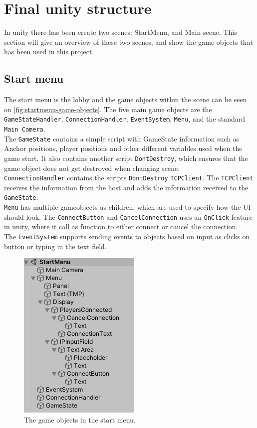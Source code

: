 \section{Final unity structure}
In unity there has been create two scenes: StartMenu, and Main scene.
This section will give an overview of these two scenes, and show the game objects that has been used in this project.

\subsection{Start menu}
The start menu is the lobby and the game objects within the scene can be seen on \autoref{fig:startmenu-game-objects}.
The five main game objects are the \texttt{GameStateHandler}, \texttt{ConnectionHandler}, \texttt{EventSystem}, \texttt{Menu}, and the standard \texttt{Main Camera}.
\\
The \texttt{GameState} contains a simple script with GameState information such as Anchor positions, player positions and other different variables used when the game start.
It also contains another script \texttt{DontDestroy}, which ensures that the game object does not get destroyed when changing scene.
\\
\texttt{ConnectionHandler} contains the scripts \texttt{DontDestroy} \texttt{TCPClient}.
The \texttt{TCPClient} receives the information from the host and adds the information received to the \texttt{GameState}.
\\
\texttt{Menu} has multiple gameobjects as children, which are used to specify how the UI should look.
The \texttt{ConnectButton} and \texttt{CancelConnection} uses an \texttt{OnClick} feature in unity, where it call as function to either connect or cancel the connection.
\\
The \texttt{EventSystem} supports sending events to objects based on input as clicks on button or typing in the text field.


\begin{figure}[H]
    \centering
    \includegraphics[width=0.4\linewidth]{figures/startmenu.PNG}
    \caption{The game objects in the start menu.}
    \label{fig:startmenu-game-objects}
\end{figure}

